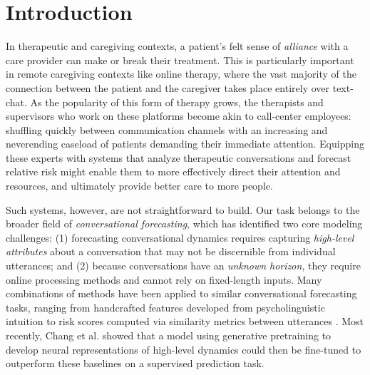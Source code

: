 \documentclass{article}
\begin{document}
\section{Introduction}
\label{sec:introduction}


In therapeutic and caregiving contexts, a patient’s felt sense of \textit{alliance} with a care provider can make or break their treatment. This is particularly important in remote caregiving contexts like online therapy, where the vast majority of the connection between the patient and the caregiver takes place entirely over text-chat. As the popularity of this form of therapy grows, the therapists and supervisors who work on these platforms become akin to call-center employees: shuffling quickly between communication channels with an increasing and neverending caseload of patients demanding their immediate attention. Equipping these experts with systems that analyze therapeutic conversations and forecast relative risk might enable them to more effectively direct their attention and resources, and ultimately provide better care to more people.

Such systems, however, are not straightforward to build. Our task belongs to the broader field of \textit{conversational forecasting}, which has identified two core modeling challenges: (1) forecasting conversational dynamics requires capturing \textit{high-level attributes} about a conversation that may not be discernible from individual utterances; and (2) because conversations have an \textit{unknown horizon}, they require online processing methods and cannot rely on fixed-length inputs. Many combinations of methods have been applied to similar conversational forecasting tasks, ranging from handcrafted features developed from psycholinguistic intuition \cite{zhang2018conversations} to risk scores computed via similarity metrics between utterances \cite{althoff2016large}. Most recently, Chang et al. \citeyear{Chang-Trouble:19} showed that a model using generative pretraining to develop neural representations of high-level dynamics could then be fine-tuned to outperform these baselines on a supervised prediction task.
\end{document}
